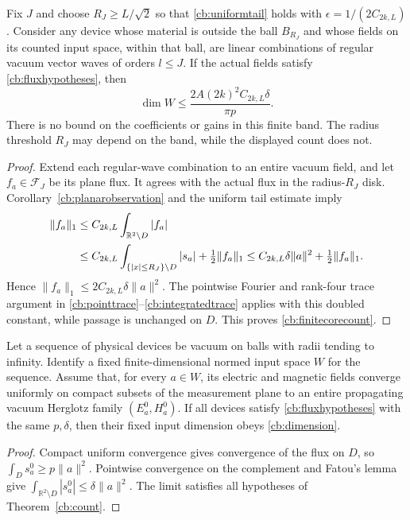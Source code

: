 \begin{corollary}
\label{cb:finitecore}
Fix $J$ and choose
$R_J\geq L/\sqrt2$ so that \eqref{cb:uniformtail} holds with
$\epsilon=1/(2C_{2k,L})$. Consider any device whose material is outside
the ball $B_{R_J}$ and whose fields on its counted input space, within that
ball, are linear combinations of regular vacuum vector waves of orders
$l\leq J$. If the actual fields satisfy \eqref{cb:fluxhypotheses}, then
\begin{equation}
 \dim W\leq\frac{2A(2k)^2C_{2k,L}\delta}{\pi p}.
 \label{cb:finitecorecount}
\end{equation}
There is no bound on the coefficients or gains in this finite band. The
radius threshold $R_J$ may depend on the band, while the displayed count
does not.
\end{corollary}
\begin{proof}
Extend each regular-wave combination to an entire vacuum field, and let
$f_a\in\mathcal F_J$ be its plane flux. It agrees with the actual flux in
the radius-$R_J$ disk. Corollary~\ref{cb:planarobservation} and the uniform
tail estimate imply
\begin{align}
 \|f_a\|_1
 &\leq C_{2k,L}\int_{\mathbb R^2\setminus D}|f_a|\notag\\
 &\leq C_{2k,L}\int_{\{|x|\leq R_J\}\setminus D}|s_a|
           +\tfrac12\|f_a\|_1
 \leq C_{2k,L}\delta\|a\|^2+\tfrac12\|f_a\|_1.
 \label{cb:tailabsorption}
\end{align}
Hence $\|f_a\|_1\leq2C_{2k,L}\delta\|a\|^2$.
The pointwise Fourier and rank-four trace argument in
\eqref{cb:pointtrace}--\eqref{cb:integratedtrace} applies with this doubled
constant, while passage is unchanged on $D$. This proves
\eqref{cb:finitecorecount}.
\end{proof}

\begin{corollary}
\label{cb:remotelimit}
Let a sequence of physical devices be vacuum on balls with radii tending
to infinity. Identify a fixed finite-dimensional normed input space $W$
for the sequence. Assume that, for every $a\in W$, its electric and magnetic
fields converge uniformly on compact subsets of the measurement plane
to an entire propagating vacuum Herglotz family $(E_a^0,H_a^0)$.
If all devices satisfy \eqref{cb:fluxhypotheses} with the same $p,\delta$, then
their fixed input dimension obeys \eqref{cb:dimension}.
\end{corollary}
\begin{proof}
Compact uniform convergence gives convergence of the flux on $D$, so
$\int_Ds_a^0\geq p\|a\|^2$. Pointwise convergence on the complement and
Fatou's lemma give
$\int_{\mathbb R^2\setminus D}|s_a^0|\leq\delta\|a\|^2$.
The limit satisfies all hypotheses of Theorem~\ref{cb:count}.
\end{proof}


